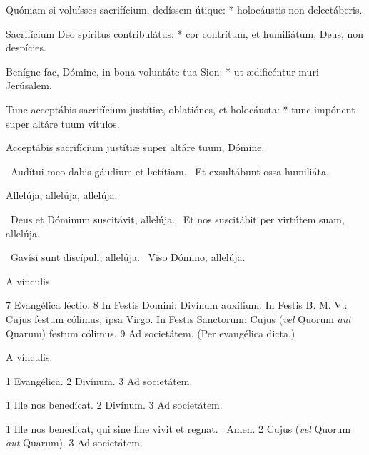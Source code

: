 Quóniam si voluísses sacrifícium, dedíssem útique: * holocáustis non delectáberis.

Sacrifícium Deo spíritus contribulátus: * cor contrítum, et humiliátum, Deus, non despícies.

Benígne fac, Dómine, in bona voluntáte tua Sion: * ut ædificéntur muri Jerúsalem.

Tunc acceptábis sacrifícium justítiæ, oblatiónes, et holocáusta: * tunc impónent super altáre tuum vítulos.


 Acceptábis sacrifícium justítiæ super altáre tuum, Dómine.


\V\ Audítui meo dabis gáudium et lætítiam. \R\ Et exsultábunt ossa humiliáta.


 Allelúja, allelúja, allelúja.


\V\ Deus et Dóminum suscitávit, allelúja. \R\ Et nos suscitábit per virtútem suam, allelúja.


\V\ Gavísi sunt discípuli, allelúja. \R\ Viso Dómino, allelúja.


 A vínculis.

 7 Evangélica léctio. 8 In Festis Domini: Divínum auxílium. In Festis B. M. V.: Cujus festum cólimus, ipsa Virgo. In Festis Sanctorum: Cujus (\textit{vel} Quorum \textit{aut} Quarum) festum cólimus. 9 Ad societátem. (Per evangélica dicta.)


 A vínculis.


 1 Evangélica. 2 Divínum. 3 Ad societátem.


 1 Ille nos benedícat. 2 Divínum. 3 Ad societátem.


 1 Ille nos benedícat, qui sine fine vivit et regnat. \R\ Amen. 2 Cujus (\textit{vel} Quorum \textit{aut} Quarum). 3 Ad societátem.


